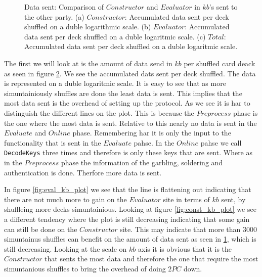 \documentclass[twoside,11pt,openright]{report}
\begin{document}
\begin{figure}
    \begin{subfigure}{\textwidth}
        \centering
        \caption{}
        \label{fig:total_kb_plot}
    \end{subfigure}

    \caption{Data sent: Comparison of $Constructor$ and $Evaluator$ in $kb$'s sent to the other party. (a) $Constructor$: Accumulated data sent per deck shuffled on a duble logarithmic scale. (b) $Evaluator$: Accumulated data sent per deck shuffled on a duble logaritmic scale. (c) $Total$: Accumulated data sent per deck shuffled on a duble logaritmic scale.}
    \label{fig:mesurement_kb}
\end{figure}

The first we will look at is the amount of data send in $kb$ per shuffled card deack as seen in figure \ref{fig:mesurement_kb}. We see the accumulated dats sent per deck shuffled. The data is represented on a duble logaritmic scale. It is easy to see that as more simuntainiously shuffles are done the least data is sent. This implies that the most data sent is the overhead of setting up the protocol. As we see it is har to distinguish the different lines on the plot. This is because the $Preprocess$ phase is the one where the most data is sent. Relative to this nearly no data is sent in the $Evaluate$ and $Online$ phase. Remembering har it is only the input to the functionality that is sent in the $Evaluate$ pahse. In the $Online$ pahse we call \verb|DecodeKeys| three times and therefore is only these keys that are sent. Where as in the $Preprocess$ phase the information of the garbling, soldering and authentication is done. Therfore more data is sent.

In figure \ref{fig:eval_kb_plot} we see that the line is flattening out indicating that there are not much more to gain on the $Evaluator$ site in terms of $kb$ sent, by shuffleing more decks simuntainious. Looking at figure \ref{fig:const_kb_plot} we see a different tendency where the plot is still decreasing indicating that some gain can still be done on the $Constructor$ site. This may indicate that more than $3000$ simuntainus shuffles can benefit on the amount of data sent as seen in \ref{fig:total_kb_plot}, which is still decreasing. Looking at the scale on $kb$ axis it is obvious that it is the $Constructor$ that sents the most data and therefore the one that require the most simuntanious shuffles to bring the overhead of doing $2PC$ down.
\end{document}
